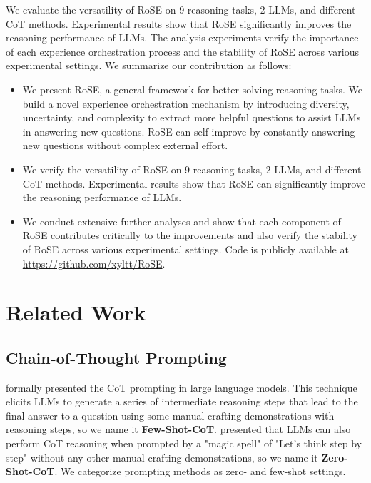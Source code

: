 \documentclass[11pt]{article}
\begin{document}
We evaluate the versatility of RoSE on 9 reasoning tasks, 2 LLMs, and different CoT methods. Experimental results show that RoSE significantly improves the reasoning performance of LLMs. The analysis experiments verify the importance of each experience orchestration process and the stability of RoSE across various experimental settings. We summarize our contribution as follows:
\begin{itemize}
\item We present RoSE, a general framework for better solving reasoning tasks. We build a novel experience orchestration mechanism by introducing diversity, uncertainty, and complexity to extract more helpful questions to assist LLMs in answering new questions. RoSE can self-improve by constantly answering new questions without complex external effort.
\item We verify the versatility of RoSE on 9 reasoning tasks, 2 LLMs, and different CoT methods. Experimental results show that RoSE can significantly improve the reasoning performance of LLMs.
\item We conduct extensive further analyses and show that each component of RoSE contributes critically to the improvements and also verify the stability of RoSE across various experimental settings. Code is publicly available at \url{https://github.com/xyltt/RoSE}.
\end{itemize}

\section{Related Work}

\subsection{Chain-of-Thought Prompting}
\citet{wei2022cot} formally presented the CoT prompting in large language models. This technique elicits LLMs to generate a series of intermediate reasoning steps that lead to the final answer to a question using some manual-crafting demonstrations with reasoning steps, so we name it \textbf{Few-Shot-CoT}. \citet{Kojima022zerocot} presented that LLMs can also perform CoT reasoning when prompted by a "magic spell" of "Let's think step by step" without any other manual-crafting demonstrations, so we name it \textbf{Zero-Shot-CoT}. We categorize prompting methods as zero- and few-shot settings.
\end{document}

